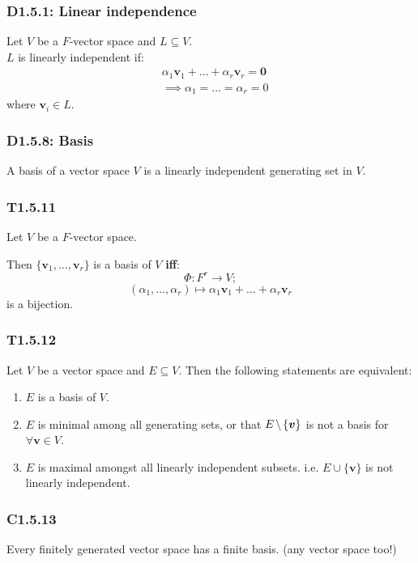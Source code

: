 \documentclass{article}
\newcommand{\vc}[1]{\boldsymbol{#1}}
\begin{document}
\begin{multicols*}{3}
\subsubsection*{D1.5.1: Linear independence}
Let $V$ be a $F$-vector space and $L\subseteq V$. \\
$L$ is linearly independent if:
\begin{align*}
    &\alpha_1\vc{v}_1+\dots+\alpha_r\vc{v}_r=\vc{0} \\
    &\implies \alpha_1=\dots=\alpha_r=0
\end{align*}
where $\vc{v}_i\in L$.

\subsubsection*{D1.5.8: Basis}
A basis of a vector space $V$ is a linearly independent
generating set in $V$.

\subsubsection*{T1.5.11}
Let $V$ be a $F$-vector space.

Then $\{\vc{v}_1,\dots,\vc{v}_r\}$ is a basis of $V$
\textbf{if{}f}:
$$\Phi:F^r\rightarrow V;$$
$$(\alpha_1,\dots,\alpha_r)\mapsto
\alpha_1\vc{v}_1+\dots+\alpha_r\vc{v}_r$$
is a bijection.

\subsubsection*{T1.5.12}
Let $V$ be a vector space and $E\subseteq V$.
Then the following statements are equivalent:
\begin{enumerate}
    \item $E$ is a basis of $V$.
    
    \item $E$ is minimal among all generating sets,
    or that $E\hspace{0.02in}\backslash\hspace{0.02in}
    \{\vc{v}\}$ is not a basis for $\forall\vc{v}\in V$.

    \item $E$ is maximal amongst all linearly independent subsets.
    i.e. $E\cup\{\vc{v}\}$ is not linearly independent.
\end{enumerate}

\subsubsection*{C1.5.13}
Every finitely generated vector space has a finite basis.
(any vector space too!)


\end{multicols*}
\end{document}
